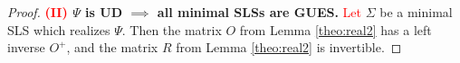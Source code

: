 \documentclass[journal,twoside,web]{ieeecolor}
\newcommand{\Rank}{\mathrm{Rank}}
\begin{document}
\begin{proof}
  \textbf{\textcolor{red}{(II)} $\Psi$ is UD $\implies$ all minimal SLSs are GUES.}
    \textcolor{red}{Let} $\Sigma$ be  a minimal SLS which realizes $\Psi$.
    Then the matrix $O$ from Lemma \ref{theo:real2} has a left inverse $O^{+}$, and 
    the matrix $R$ from Lemma \ref{theo:real2} is invertible.

\end{proof}
\end{document}
